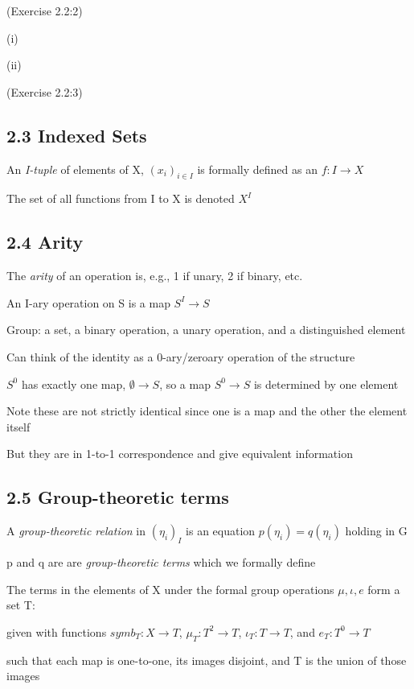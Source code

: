 \documentclass[12pt]{article}
\begin{document}
\noindent
(Exercise 2.2:2)

(i)

(ii)

\noindent
(Exercise 2.2:3)

\noindent

\subsection{2.3 Indexed Sets}

An \textit{I-tuple} of elements of X, $(x_i)_{i \in I}$ is formally defined as an $f: I \to X$

The set of all functions from I to X is denoted $X^I$

\subsection{2.4 Arity}

\noindent
The \textit{arity} of an operation is, e.g., 1 if unary, 2 if binary, etc.

An I-ary operation on S is a map $S^I \to S$

Group: a set, a binary operation, a unary operation, and a distinguished element

\noindent
Can think of the identity as a 0-ary/zeroary operation of the structure

$S^0$ has exactly one map, $\emptyset \to S$, so a map $S^0 \to S$ is determined by one element

Note these are not strictly identical since one is a map and the other the element itself

But they are in 1-to-1 correspondence and give equivalent information

\subsection{2.5 Group-theoretic terms}

\noindent
A \textit{group-theoretic relation} in $(\eta_i)_I$ is an equation $p(\eta_i) = q(\eta_i)$ holding in G

p and q are are \textit{group-theoretic terms} which we formally define

\noindent
The terms in the elements of X under the formal group operations $\mu, \iota, e$ form a set T:

given with functions $symb_T: X \to T$, $\mu_T: T^2 \to T$, $\iota_T: T \to T$, and $e_T: T^0 \to T$

such that each map is one-to-one, its images disjoint, and T is the union of those images
\end{document}
